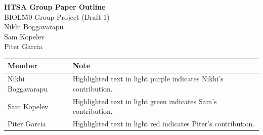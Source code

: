 \documentclass[12pt]{article}
\begin{document}
\begin{center}
{\Large \textbf{HTSA Group Paper Outline}}\\
{\normalsize BIOL550 Group Project (Draft 1)}\\[0.5em]
{\normalsize Nikhi Boggavarapu}\\
{\normalsize Sam Kopelev}\\
{\normalsize Piter Garcia}\\
\end{center}
\vspace{0.5em}
\noindent
\begin{tabular}{|p{1.55in}|p{4.65in}|}
\hline
\textbf{Member} & \textbf{Note} \\ \hline
\cellcolor[HTML]{D9D2E9}Nikhi Boggavarapu & \cellcolor[HTML]{D9D2E9}Highlighted text in light purple indicates Nikhi's contribution. \\ \hline
\cellcolor[HTML]{B6D7A8}Sam Kopelev & \cellcolor[HTML]{B6D7A8}Highlighted text in light green indicates Sam's contribution. \\ \hline
\cellcolor[HTML]{F4CCCC}Piter Garcia & \cellcolor[HTML]{F4CCCC}Highlighted text in light red indicates Piter's contribution. \\ \hline
\end{tabular}
\end{document}
